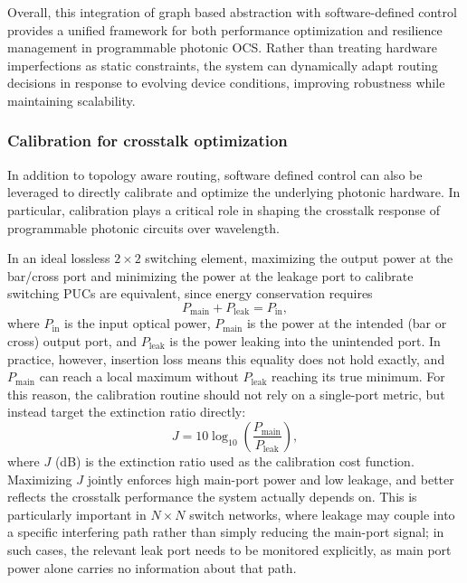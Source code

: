 Overall, this integration of graph based abstraction with software-defined control provides a unified framework for both performance optimization and resilience management in programmable photonic OCS.
Rather than treating hardware imperfections as static constraints, the system can dynamically adapt routing decisions in response to evolving device conditions, improving robustness while maintaining scalability.
\subsubsection{Calibration for crosstalk optimization} \label{subsec:software_calibration}
In addition to topology aware routing, software defined control can also be leveraged to directly calibrate and optimize the underlying photonic hardware.
In particular, calibration plays a critical role in shaping the crosstalk response of programmable photonic circuits over wavelength.

In an ideal lossless $2\times2$ switching element, maximizing the output power at the bar/cross port and minimizing the power at the leakage port to calibrate switching PUCs are equivalent, since energy conservation requires
\begin{equation}
    P_{\text{main}} + P_{\text{leak}} = P_{\text{in}},
\end{equation}
where $P_{\text{in}}$ is the input optical power, $P_{\text{main}}$ is the power at the intended (bar or cross) output port, and $P_{\text{leak}}$ is the power leaking into the unintended port.
In practice, however, insertion loss means this equality does not hold exactly, and $P_{\text{main}}$ can reach a local maximum without $P_{\text{leak}}$ reaching its true minimum.
For this reason, the calibration routine should not rely on a single-port metric, but instead target the extinction ratio directly:
\begin{equation}
    J = 10 \log_{10}\!\left(\frac{P_{\text{main}}}{P_{\text{leak}}}\right),
\end{equation}
where $J$ (dB) is the extinction ratio used as the calibration cost function.
Maximizing $J$ jointly enforces high main-port power and low leakage, and better reflects the crosstalk performance the system actually depends on.
This is particularly important in $N\times N$ switch networks, where leakage may couple into a specific interfering path rather than simply reducing the main-port signal;
in such cases, the relevant leak port needs to be monitored explicitly, as main port power alone carries no information about that path.

